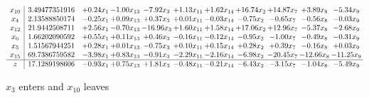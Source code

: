 \documentclass[9pt]{article}
\begin{document}
 \[\begin{array}{c| c c@{\hskip 2pt} c@{\hskip 2pt} c@{\hskip 2pt} c@{\hskip 2pt} c@{\hskip 2pt} c@{\hskip 2pt} c@{\hskip 2pt} c@{\hskip 2pt} c@{\hskip 2pt} }
 x_{10}   &  3.49477351916 & +  0.24 x_{1} & -1.00 x_{13} & -7.92 x_{3} & +  1.13 x_{11} & +  1.62 x_{14} & + 16.74 x_{2} & + 14.87 x_{7} & +  3.89 x_{8} & -5.34 x_{9}\\
 x_{4}   &  2.13588850174 & -0.25 x_{1} & +  0.09 x_{13} & +  0.37 x_{3} & +  0.01 x_{11} & -0.03 x_{14} & -0.75 x_{2} & -0.65 x_{7} & -0.56 x_{8} & -0.03 x_{9}\\
 x_{12}   &  21.9442508711 & +  2.56 x_{1} & -0.70 x_{13} & -16.96 x_{3} & +  1.60 x_{11} & +  1.58 x_{14} & + 17.06 x_{2} & + 12.96 x_{7} & -5.37 x_{8} & -2.68 x_{9}\\
 x_{6}   &  1.66202090592 & +  0.55 x_{1} & +  0.11 x_{13} & +  0.46 x_{3} & -0.16 x_{11} & -0.12 x_{14} & -0.95 x_{2} & -1.00 x_{7} & -0.49 x_{8} & -0.31 x_{9}\\
 x_{5}   &  1.51567944251 & +  0.28 x_{1} & +  0.01 x_{13} & -0.75 x_{3} & +  0.10 x_{11} & +  0.15 x_{14} & +  0.28 x_{2} & +  0.39 x_{7} & -0.16 x_{8} & +  0.03 x_{9}\\
 x_{15}   &  69.7386759582 & -3.98 x_{1} & +  0.83 x_{13} & -0.91 x_{3} & -2.29 x_{11} & -2.16 x_{14} & -6.98 x_{2} & -20.45 x_{7} & -12.66 x_{8} & -11.25 x_{9}\\
\hline
z    &  17.1289198606 & -0.93 x_{1} & +  0.75 x_{13} & +  1.81 x_{3} & -0.48 x_{11} & -0.21 x_{14} & -6.43 x_{2} & -3.15 x_{7} & -1.04 x_{8} & -5.49 x_{9}\\
\end{array}\]


 $ x_{3} $ enters and $ x_{10} $ leaves 
\end{document}
